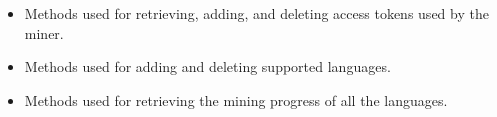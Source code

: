 \begin{itemize}
    \begin{itemize}
        \item Methods used for retrieving, adding, and deleting access tokens used by the miner.
        \item Methods used for adding and deleting supported languages.
        \item Methods used for retrieving the mining progress of all the languages.
    \end{itemize}
\end{itemize}